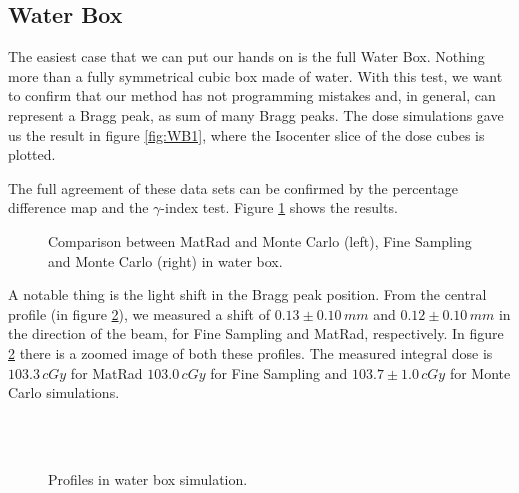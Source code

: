 \documentclass[12pt, a4paper, twoside]{book}
\begin{document}
\subsection{Water Box}
The easiest case that we can put our hands on is the full Water Box. Nothing more than a fully symmetrical cubic box made of water. With this test, we want to confirm that our method has not programming mistakes and, in general, can represent a Bragg peak, as sum of many Bragg peaks. 
The dose simulations gave us the result in figure \ref{fig:WB1}, where the Isocenter slice of the dose cubes is plotted.



The full agreement of these data sets can be confirmed by the percentage difference map and the $\gamma$-index test. Figure \ref{fig:WB1gam} shows the results.
\begin{figure}[!ht]
\centering
{} 
\caption{Comparison between MatRad and Monte Carlo (left), Fine Sampling and Monte Carlo (right) in water box.}
\label{fig:WB1gam}
\end{figure}

A notable thing is the light shift in the Bragg peak position. From the central profile (in figure \ref{fig:WB1prof}), we measured a shift of $0.13\pm0.10\,mm$ and $0.12\pm0.10\,mm$ in the direction of the beam, for Fine Sampling and MatRad, respectively. In figure \ref{fig:WB1prof} there is a zoomed image of both these profiles.
The measured integral dose is $103.3\,cGy$ for MatRad $103.0\,cGy$ for Fine Sampling and $103.7\pm1.0\,cGy$ for Monte Carlo simulations.\\
\\

\begin{figure}[!ht]
\centering
{} 
 \\
\caption{Profiles in water box simulation.}
\label{fig:WB1prof}
\end{figure}
\end{document}
